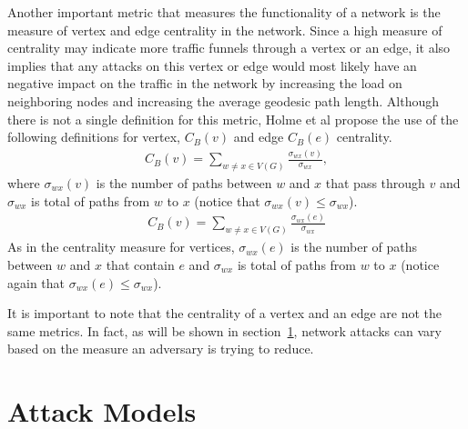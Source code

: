 \documentclass[doc]{apa}%
\begin{document}
Another important metric that measures the functionality of a network is the measure of vertex and edge centrality in the network. Since a high measure of centrality may indicate more traffic funnels through a vertex or an edge, it also implies that any attacks on this vertex or edge would most likely have an negative impact on the traffic in the network by increasing the load on neighboring nodes and increasing the average geodesic path length. Although there is not a single definition for this metric, Holme et al \cite{Attacks} propose the use of the following definitions for vertex, $C_{B}(v)$ and edge $C_{B}(e)$ centrality.
\begin{eqnarray}
C_{B}(v) = \sum_{w \not= x \in V(G)} \frac{\sigma_{wx}(v)}{\sigma_{wx}},
\end{eqnarray}
where $\sigma_{wx}(v)$ is the number of paths between $w$ and $x$ that pass through $v$ and $\sigma_{wx}$ is total of paths from $w$ to $x$ (notice that $\sigma_{wx}(v) \leq \sigma_{wx}$).
\begin{eqnarray}
C_{B}(v) = \sum_{w \not= x \in V(G)} \frac{\sigma_{wx}(e)}{\sigma_{wx}}
\end{eqnarray}
As in the centrality measure for vertices, $\sigma_{wx}(e)$ is the number of paths between $w$ and $x$ that contain $e$ and $\sigma_{wx}$ is total of paths from $w$ to $x$ (notice again that $\sigma_{wx}(e) \leq \sigma_{wx}$).

It is important to note that the centrality of a vertex and an edge are not the same metrics. In fact, as will be shown in section~\ref{AttackStrategies}, network attacks can vary based on the measure an adversary is trying to reduce. 




\section{Attack Models}
\label{AttackStrategies}
\end{document}
